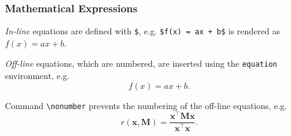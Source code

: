 \documentclass[10pt,    %
    english,            %
    xcolor=table,       %
    envcountsect,       %
    aspectratio=43      %
]{beamer}
\begin{document}
\begin{frame}
    \frametitle{Mathematical Expressions} 
    
    \textit{In-line} equations are defined with \texttt{\$}, e.g. \texttt{\$f(x) = ax + b\$} is rendered as $f(x)=ax + b$.
    
    \vspace{0.25cm}
    \textit{Off-line} equations, which are numbered, are inserted using the \texttt{equation} environment, e.g.
    \begin{equation}
        \label{equ:affine}
        f(x) = ax + b.
    \end{equation}
    
    Command \texttt{\textbackslash{}nonumber} prevents the numbering of the off-line equations, e.g.
    \begin{equation}
        \label{equ:rayleigh}
        r(\mathbf{x},\mathbf{M}) = \frac{\mathbf{x}^\top \mathbf{M} \mathbf{x}}{\mathbf{x}^\top \mathbf{x}}. \nonumber
    \end{equation}
    
    
    
    
    
    
\end{frame}




\end{document}
